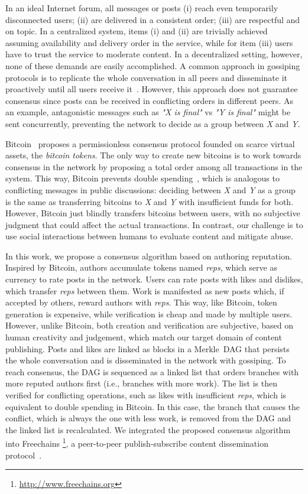 \documentclass[10pt,journal,compsoc]{IEEEtran}
\newcommand{\reps}     {\emph{reps}\xspace}
\begin{document}
In an ideal Internet forum, all messages or posts
(i)   reach even temporarily disconnected users;
(ii)  are delivered in a consistent order;
(iii) are respectful and on topic.
In a centralized system, items (i) and (ii) are trivially achieved assuming
availability and delivery order in the service, while for item (iii) users have
to trust the service to moderate content.
In a decentralized setting, however, none of these demands are easily
accomplished.
A common approach in gossiping protocols is to replicate the whole conversation
in all peers and disseminate it proactively until all users receive
it~\cite{p2p.survey}.
However, this approach does not guarantee consensus since posts can be received
in conflicting orders in different peers.
As an example, antagonistic messages such as \emph{"X is final"} vs
\emph{"Y is final"} might be sent concurrently, preventing the network to
decide as a group between \emph{X} and \emph{Y}.

Bitcoin~\cite{p2p.bitcoin} proposes a permissionless consensus protocol founded
on scarce virtual assets, the \emph{bitcoin tokens}.
%
The only way to create new bitcoins is to work towards consensus in the network
by proposing a total order among all transactions in the system.
%
This way, Bitcoin prevents double spending~\cite{p2p.bitcoin}, which is
analogous to conflicting messages in public discussions:
    deciding between \emph{X} and \emph{Y} as a group is the same as
    transferring bitcoins to \emph{X} and \emph{Y} with insufficient funds for
    both.
%
However, Bitcoin just blindly transfers bitcoins between users, with no
subjective judgment that could affect the actual transactions.
In contrast, our challenge is to use social interactions between humans to
evaluate content and mitigate abuse.

In this work, we propose a consensus algorithm based on authoring reputation.
Inspired by Bitcoin, authors accumulate tokens named \reps, which serve as
currency to rate posts in the network.
Users can rate posts with likes and dislikes, which transfer \reps between
them.
Work is manifested as new posts which, if accepted by others, reward authors
with \reps.
This way, like Bitcoin, token generation is expensive, while verification is
cheap and made by multiple users.
However, unlike Bitcoin, both creation and verification are subjective, based
on human creativity and judgement, which match our target domain of content
publishing.
Posts and likes are linked as blocks in a Merkle~DAG that persists the whole
conversation and is disseminated in the network with gossiping.
To reach consensus, the DAG is sequenced as a linked list that orders branches
with more reputed authors first (i.e., branches with more work).
The list is then verified for conflicting operations, such as likes with
insufficient \reps, which is equivalent to double spending in Bitcoin.
In this case, the branch that causes the conflict, which is always the one with
less work, is removed from the DAG and the linked list is recalculated.
We integrated the proposed consensus algorithm into Freechains%
\footnote{\url{http://www.freechains.org}},
a peer-to-peer publish-subscribe content dissemination
protocol~\cite{fcs.sbseg20}.
\end{document}
